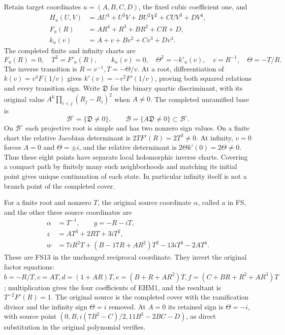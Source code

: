 \documentclass[
  10pt,
  a4paper,
]{article}
\begin{document}
Retain target coordinates \(u=(A,B,C,D)\), the fixed cubic coefficient
one, and \[
\begin{aligned}
H_u(U,V)&=AU^4+U^3V+BU^2V^2+CUV^3+DV^4,\\
F_u(R)&=AR^4+R^3+BR^2+CR+D,\\
k_u(v)&=A+v+Bv^2+Cv^3+Dv^4.
\end{aligned}
\tag{EHM1}
\] The completed finite and infinity charts are \[
F_u(R)=0,\quad T^2=F'_u(R),\qquad
k_u(v)=0,\quad\Theta^2=-k'_u(v),
\quad v=R^{-1},\quad\Theta=-T/R.
\tag{EHM2}
\] The inverse transition is \(R=v^{-1},T=-\Theta/v\). At a root,
differentiation of \(k(v)=v^4F(1/v)\) gives \(k'(v)=-v^2F'(1/v)\),
proving both squared relations and every transition sign. Write
\(\mathfrak D\) for the binary quartic discriminant, with its original
value \(A^6\prod_{i<j}(R_j-R_i)^2\) when \(A\ne0\). The completed
unramified base is \[
\mathcal B^\circ=\{\mathfrak D\ne0\},\qquad
\mathcal B=\{A\mathfrak D\ne0\}\subset\mathcal B^\circ.
\tag{EHM3}
\] On \(\mathcal B^\circ\) each projective root is simple and has two
nonzero sign values. On a finite chart the relative Jacobian determinant
is \(2T F'(R)=2T^3\ne0\). At infinity, \(v=0\) forces \(A=0\) and
\(\Theta=\pm i\), and the relative determinant is
\(2\Theta k'(0)=2\Theta\ne0\). Thus these eight points have separate
local holomorphic inverse charts. Covering a compact path by finitely
many such neighborhoods and matching its initial point gives unique
continuation of each state. In particular infinity itself is not a
branch point of the completed cover.

For a finite root and nonzero \(T\), the original source coordinate
\(\alpha\), called \(a\) in FS, and the other three source coordinates
are \[
\begin{aligned}
\alpha&=T^{-1},\qquad y=-R-iT,\\
z&=AT^3+2RT+3iT^2,\\
w&=7iR^2T+(B-17R+AR^2)T^2-13iT^3-2AT^4.
\end{aligned}
\tag{EHM4}
\] These are FS13 in the unchanged reciprocal coordinate. They invert
the original factor equations:
\(b=-R/T,c=AT,d=(1+AR)T,e=(B+R+AR^2)T,f=(C+BR+R^2+AR^3)T\);
multiplication gives the four coefficients of EHM1, and the resultant is
\(T^{-2}F'(R)=1\). The original source is the completed cover with the
ramification divisor and the infinity sign \(\Theta=i\) removed. At
\(A=0\) its retained sign is \(\Theta=-i\), with source point
\((0,B,i(7B^2-C)/2,11B^3-2BC-D)\), as direct substitution in the
original polynomial verifies.
\end{document}
